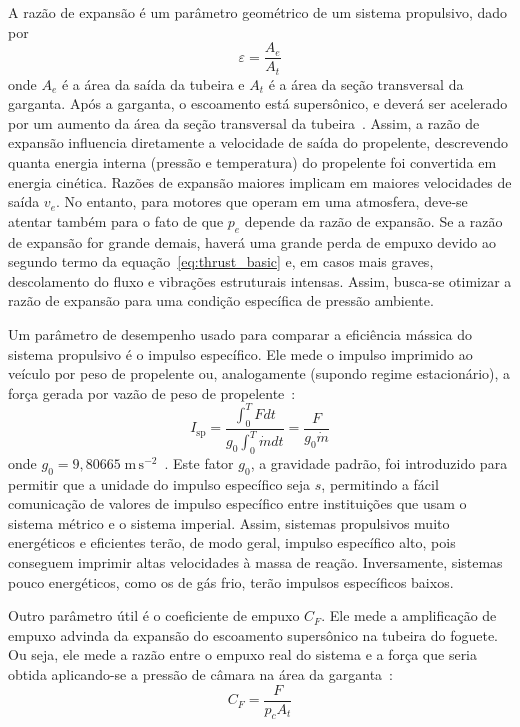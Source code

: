 A razão de expansão é um parâmetro geométrico de um sistema propulsivo, dado por
\begin{equation}
    \label{eq:exp_ratio}
    \varepsilon = \frac{A_e}{A_t}
\end{equation}
onde \(A_e\) é a área da saída da tubeira e \(A_t\) é a área da seção transversal da garganta. Após a garganta, o escoamento está supersônico, e deverá ser acelerado por um aumento da área da seção transversal da tubeira~\cite{anderson}. Assim, a razão de expansão influencia diretamente a velocidade de saída do propelente, descrevendo quanta energia interna (pressão e temperatura) do propelente foi convertida em energia cinética. Razões de expansão maiores implicam em maiores velocidades de saída \(v_e\). No entanto, para motores que operam em uma atmosfera, deve-se atentar também para o fato de que \(p_e\) depende da razão de expansão. Se a razão de expansão for grande demais, haverá uma grande perda de empuxo devido ao segundo termo da equação~\ref{eq:thrust_basic} e, em casos mais graves, descolamento do fluxo e vibrações estruturais intensas. Assim, busca-se otimizar a razão de expansão para uma condição específica de pressão ambiente.

Um parâmetro de desempenho usado para comparar a eficiência mássica do sistema propulsivo é o impulso específico. Ele mede o impulso imprimido ao veículo por peso de propelente ou, analogamente (supondo regime estacionário), a força gerada por vazão de peso de propelente~\cite{Sutton}:
\begin{equation}
    \label{eq:Isp}
    I_{\text{sp}} = \frac{\int^T_0 F dt}{g_0 \int^T_0 \dot{m}dt} = \frac{F}{g_0 \dot{m}}
\end{equation}
onde \(g_0=9,80665\;\mathrm{m}\,\mathrm{s}^{-2}\)~\cite{CGPM}. Este fator \(g_0\), a gravidade padrão, foi introduzido para permitir que a unidade do impulso específico seja \(s\), permitindo a fácil comunicação de valores de impulso específico entre instituições que usam o sistema métrico e o sistema imperial. Assim, sistemas propulsivos muito energéticos e eficientes terão, de modo geral, impulso específico alto, pois conseguem imprimir altas velocidades à massa de reação. Inversamente, sistemas pouco energéticos, como os de gás frio, terão impulsos específicos baixos.

Outro parâmetro útil é o coeficiente de empuxo \(C_F\). Ele mede a amplificação de empuxo advinda da expansão do escoamento supersônico na tubeira do foguete. Ou seja, ele mede a razão entre o empuxo real do sistema e a força que seria obtida aplicando-se a pressão de câmara na área da garganta~\cite{Sutton}:
\begin{equation}
    \label{eq:C_F}
    C_F = \frac{F}{p_c A_t}
\end{equation}

